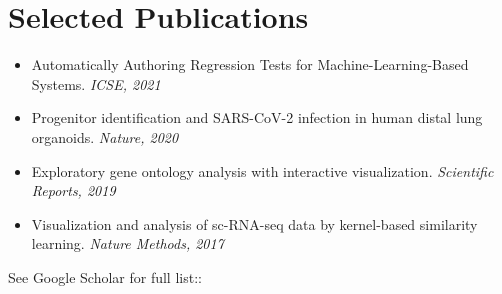 \documentclass[letterpaper,11pt]{article}
\makeatletter
\newcommand{\resumeItem}[2]{
  \item\small{
    \textbf{#1}{: #2 \vspace{-2pt}}
  }
}
\newcommand{\resumeSubheading}[4]{
  \vspace{-1pt}\item
    \begin{tabular*}{0.97\textwidth}[t]{l@{\extracolsep{\fill}}r}
      \textbf{#1} & #2 \\
      \textit{\small#3} & \textit{\small #4} \\
    \end{tabular*}\vspace{-5pt}
}
\newcommand{\resumeSubHeadingListEnd}{\end{itemize}}
\newcommand{\resumeItemListStart}{\begin{itemize}}
\newcommand{\resumeItemListEnd}{\end{itemize}\vspace{-5pt}}
\makeatother
\begin{document}





\section{Selected Publications}
\vspace{0.5em}
  \begin{itemize}[leftmargin=*, topsep=4pt, parsep=2pt, itemsep=1pt]
    \item Automatically Authoring Regression Tests for Machine-Learning-Based Systems. \textit{ICSE, 2021}
    \item Progenitor identification and SARS-CoV-2 infection in human distal lung organoids. \textit{Nature, 2020}
    \item Exploratory gene ontology analysis with interactive visualization. \textit{Scientific Reports, 2019}
    \item Visualization and analysis of sc-RNA-seq data by kernel-based similarity learning. \textit{Nature Methods, 2017}
  \end{itemize}

See Google Scholar for full list:: \url{}
\end{document}
